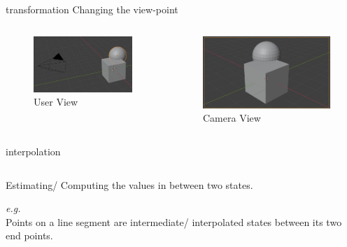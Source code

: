 \documentclass[aspectratio=169,xcolor={dvipsnames,svgnames}]{beamer}
\begin{document}
\begin{frame}[label={sec:orgf264469}]{transformation}
Changing the view-point

\begin{columns}
\begin{column}{.5\columnwidth}
\begin{figure}[htbp]
\centering
\includegraphics[width=.9\linewidth]{images/user-view.jpg}
\caption{User View}
\end{figure}
\end{column}

\begin{column}{.5\columnwidth}
\begin{figure}[htbp]
\centering
\includegraphics[width=.9\linewidth]{images/camera-view.jpg}
\caption{Camera View}
\end{figure}
\end{column}
\end{columns}
\end{frame}
\begin{frame}[label={sec:org2e62b34}]{interpolation}
\begin{columns}
\begin{column}{.45\columnwidth}
Estimating/ Computing the values in between two states.

\emph{e.g.} \\[0pt]
Points on a line segment are intermediate/ interpolated
states between its two end points.
\end{column}
\end{columns}
\end{frame}
\end{document}
